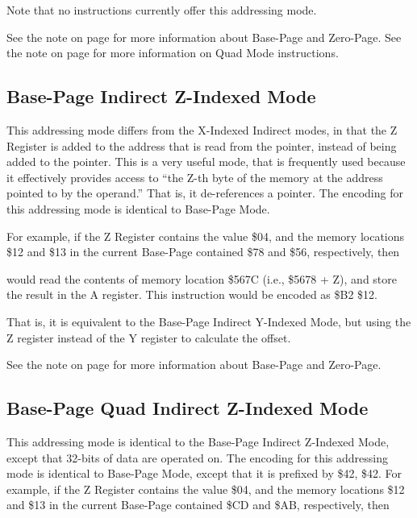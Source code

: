 Note that no instructions currently offer this addressing mode.

See the note on page \pageref{Base-Page (Zero-Page) Mode} for more information about Base-Page and Zero-Page.
See the note on page \pageref{Base-Page (Zero-Page) Quad Mode} for more information on Quad Mode instructions.
\fi

\subsection{Base-Page Indirect Z-Indexed Mode}

This addressing mode differs from the X-Indexed Indirect modes, in that the Z Register is
added to the address that is read from the pointer, instead of being added to the pointer.
This is a very useful mode, that is frequently used because it effectively provides access to
``the Z-th byte of the memory at the address pointed to by the operand.'' That is, it de-references
a pointer.
The encoding for this addressing mode is identical to Base-Page Mode.

For example, if the Z Register contains the value \$04, and the memory locations \$12 and \$13 in the current
Base-Page contained \$78 and \$56, respectively,
then


would read the contents of memory location \$567C (i.e., \$5678 + Z),
and store the result in the A register. This instruction would be encoded as \$B2 \$12.

That is, it is equivalent to the Base-Page Indirect Y-Indexed Mode, but using the Z register instead
of the Y register to calculate the offset.

See the note on page \pageref{Base-Page (Zero-Page) Mode} for more information about Base-Page and Zero-Page.

\subsection{Base-Page Quad Indirect Z-Indexed Mode}

This addressing mode is identical to the Base-Page Indirect Z-Indexed Mode, except that
32-bits of data are operated on. The encoding for this addressing mode is identical to
Base-Page Mode, except that it is prefixed by \$42, \$42.
For example, if the Z Register contains the value \$04, and the memory locations \$12 and \$13 in the current
Base-Page contained \$CD and \$AB, respectively,
then

